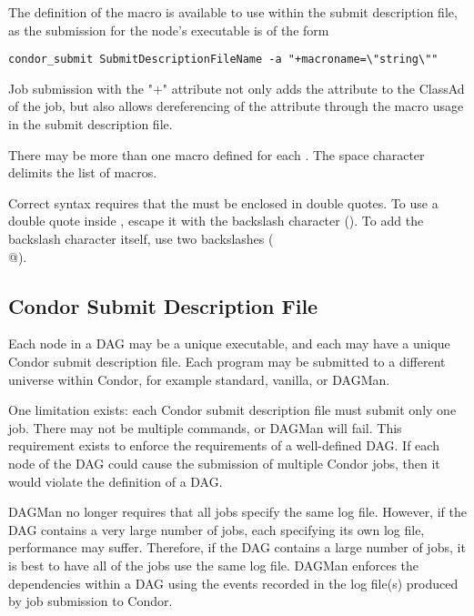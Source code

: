   

The definition of the macro is available to use within the
submit description file, as the submission for the node's
executable is of the form
\begin{verbatim}
condor_submit SubmitDescriptionFileName -a "+macroname=\"string\""
\end{verbatim}
Job submission with the "+" attribute not only adds the attribute
to the ClassAd of the job,
but also allows dereferencing of the attribute through the macro
usage in the submit description file.

There may be more than one macro defined for each .
The space character delimits the list of macros.

Correct syntax requires that the \verb@string@ must be
enclosed in double quotes.
To use a double quote inside \verb@string@,
escape it with the backslash character (\verb@\@).
To add the backslash character itself, use two backslashes (\verb@\\@).



\subsection{Condor Submit Description File}

Each node in a DAG may be a unique executable, and each may have a unique
Condor submit description file.
Each program may be submitted to a different universe
within Condor, for example standard,
vanilla, or DAGMan.

One limitation exists:
each Condor submit description file must submit only one job.
There may not be multiple \verb@queue@ commands, or DAGMan will fail.
This requirement exists to enforce the requirements of a well-defined DAG.
If each node of the DAG could cause the submission of multiple
Condor jobs, then it would violate the definition of a DAG.

DAGMan no longer requires that all jobs specify the same log file.
However, if the DAG contains a very large number of jobs, each
specifying its own log file, performance may suffer.  Therefore,
if the DAG contains a large number of jobs, it is best to have
all of the jobs use the same log file.
DAGMan enforces the dependencies within a DAG
using the events recorded in the
log file(s) produced by job submission to Condor.

